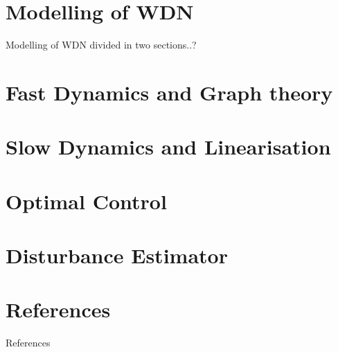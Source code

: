 \documentclass[10pt]{beamer}
\begin{document}

\section{Modelling of WDN}

\begin{frame}{Modelling of WDN}
	divided in two sections..?
\end{frame}
\section{Fast Dynamics and Graph theory}
%
%
\section{Slow Dynamics and Linearisation}

%
%

\section{Optimal Control}


\section{Disturbance Estimator}

%
%
%
%



















\section{References}
\begin{frame}{References}
	
	
\end{frame}

{\aauwavesbg
\begin{frame}
\end{frame}}
\end{document}
